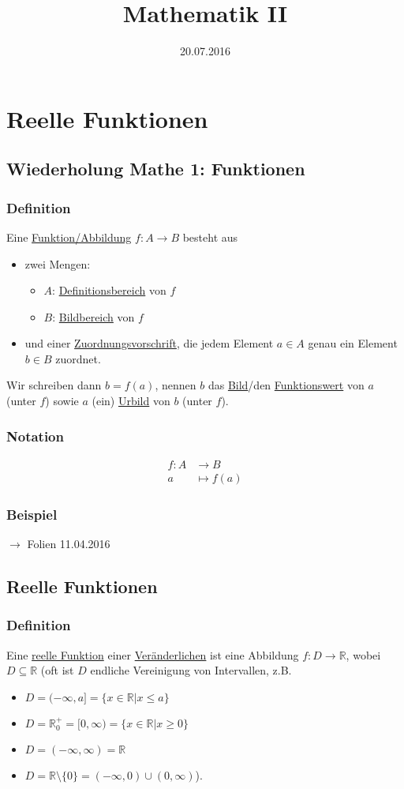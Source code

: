 \documentclass[12pt, titlepage]{article}
\title{Mathematik II}
\date{20.07.2016}
\newcommand{\R}{\mathds{R}}
\renewcommand{\>}{\rightarrow}
\renewcommand{\*}{\cdot}
\begin{document}
	\maketitle
	\tableofcontents
	\newpage
	\section{Reelle Funktionen}
	\subsection{Wiederholung Mathe 1: Funktionen}
	\subsubsection*{Definition}
		Eine \underline{Funktion/Abbildung} $f\colon A\> B$ besteht aus
		\begin{itemize}
			\item zwei Mengen:
			\begin{itemize}
				\item $A$: \underline{Definitionsbereich} von $f$
				\item $B$: \underline{Bildbereich} von $f$
			\end{itemize}
			\item und einer \underline{Zuordnungsvorschrift}, die jedem Element $a\in A$ genau ein Element $b\in B$ zuordnet.
		\end{itemize}
		Wir schreiben dann $b=f(a)$, nennen $b$ das \underline{Bild}/den \underline{Funktionswert} von $a$ (unter $f$) sowie $a$ (ein) \underline{Urbild} von $b$ (unter $f$).
	\subsubsection*{Notation}
		\vspace{-1cm}\begin{align*}
			f\colon A&\> B\\
			a&\mapsto f(a)
		\end{align*}
	\subsubsection*{Beispiel}
		$\>$ Folien 11.04.2016
	\subsection{Reelle Funktionen}
	\subsubsection*{Definition}
	Eine \underline{reelle Funktion} einer \underline{Veränderlichen} ist eine Abbildung $f\colon D\> \R$, wobei $D\subseteq \R$ (oft ist $D$ endliche Vereinigung von Intervallen, z.B.
	\begin{itemize}
		\item $ D=(-\infty,a]=\{x\in \R|x\leq a\} $
		\item $ D=\R^+_0=[0,\infty)=\{x\in\R|x\geq 0\}$
		\item $ D=(-\infty,\infty)=\R $
		\item $ D=\R\setminus\{0\}=(-\infty,0)\cup(0,\infty) $\hfill).
	\end{itemize}
\end{document}
